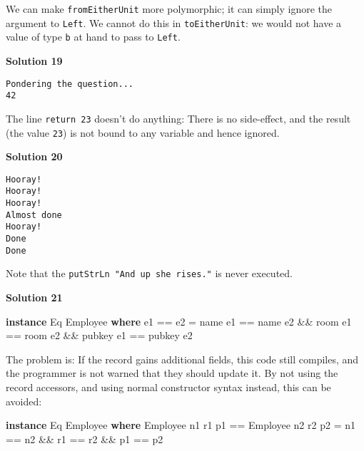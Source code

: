 \documentclass[11pt,
  american,
  DIV13]{article}
\newenvironment{Shaded}{}{}
\newcommand{\DataTypeTok}[1]{\textcolor[rgb]{0.56,0.13,0.00}{#1}}
\newcommand{\KeywordTok}[1]{\textcolor[rgb]{0.00,0.44,0.13}{\textbf{#1}}}
\newcommand{\NormalTok}[1]{#1}
\newcommand{\OperatorTok}[1]{\textcolor[rgb]{0.40,0.40,0.40}{#1}}
\newcommand{\OtherTok}[1]{\textcolor[rgb]{0.00,0.44,0.13}{#1}}
\begin{document}
We can make \texttt{fromEitherUnit} more polymorphic; it can simply
ignore the argument to \texttt{Left}. We cannot do this in
\texttt{toEitherUnit}: we would not have a value of type \texttt{b} at
hand to pass to \texttt{Left}.

\textbf{Solution 19}

\begin{verbatim}
Pondering the question...
42
\end{verbatim}

The line \texttt{return\ 23} doesn't do anything: There is no
side-effect, and the result (the value \texttt{23}) is not bound to any
variable and hence ignored.

\textbf{Solution 20}

\begin{verbatim}
Hooray!
Hooray!
Hooray!
Almost done
Hooray!
Done
Done
\end{verbatim}

Note that the \texttt{putStrLn\ "And\ up\ she\ rises."} is never
executed.

\textbf{Solution 21}

\begin{Shaded}
\begin{Highlighting}[]
\KeywordTok{instance} \DataTypeTok{Eq} \DataTypeTok{Employee} \KeywordTok{where}
\NormalTok{    e1 }\OperatorTok{==}\NormalTok{ e2 }\OtherTok{=}
\NormalTok{        name e1 }\OperatorTok{==}\NormalTok{ name e2 }\OperatorTok{\&\&}
\NormalTok{        room e1 }\OperatorTok{==}\NormalTok{ room e2 }\OperatorTok{\&\&}
\NormalTok{        pubkey e1 }\OperatorTok{==}\NormalTok{ pubkey e2}
\end{Highlighting}
\end{Shaded}

The problem is: If the record gains additional fields, this code still
compiles, and the programmer is not warned that they should update it.
By not using the record accessors, and using normal constructor syntax
instead, this can be avoided:

\begin{Shaded}
\begin{Highlighting}[]
\KeywordTok{instance} \DataTypeTok{Eq} \DataTypeTok{Employee} \KeywordTok{where}
    \DataTypeTok{Employee}\NormalTok{ n1 r1 p1 }\OperatorTok{==} \DataTypeTok{Employee}\NormalTok{ n2 r2 p2 }\OtherTok{=}
\NormalTok{        n1 }\OperatorTok{==}\NormalTok{ n2 }\OperatorTok{\&\&}\NormalTok{ r1 }\OperatorTok{==}\NormalTok{ r2 }\OperatorTok{\&\&}\NormalTok{ p1 }\OperatorTok{==}\NormalTok{ p2}
\end{Highlighting}
\end{Shaded}
\end{document}
